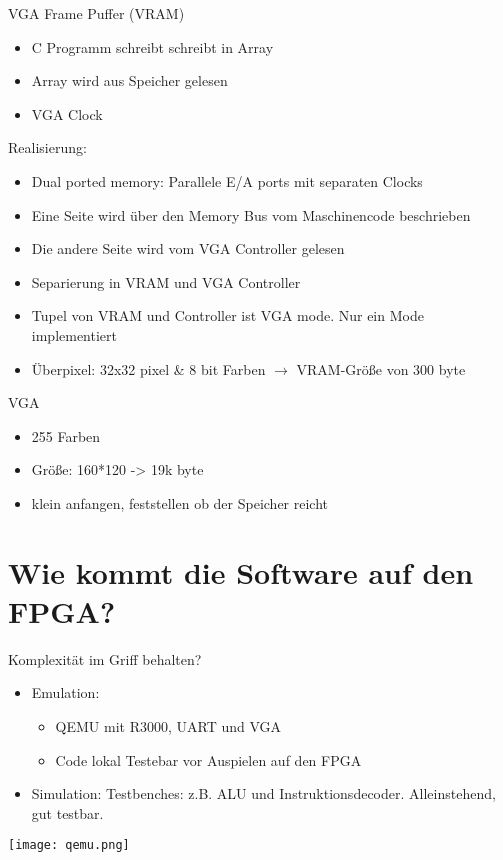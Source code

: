 \begin{frame}{VGA Frame Puffer (VRAM)}
	\begin{itemize}
		\item C Programm schreibt schreibt in Array
		\item Array wird aus Speicher gelesen
		\item VGA Clock
	\end{itemize}
	\pause
	Realisierung:
	\begin{itemize}
		\item Dual ported memory: Parallele E/A ports mit separaten Clocks
		\item Eine Seite wird über den Memory Bus vom Maschinencode beschrieben
		\item Die andere Seite wird vom VGA Controller gelesen
		\item Separierung in VRAM und VGA Controller
		\item Tupel von VRAM und Controller ist VGA mode. Nur ein Mode implementiert
		\item Überpixel: 32x32 pixel \& 8 bit Farben $\rightarrow$ VRAM-Größe von 300 byte
	\end{itemize}

\end{frame}

\begin{frame}{VGA}
	\begin{itemize}		
		\item 255 Farben
		\item Größe: 160*120 -> 19k byte
		\item klein anfangen, feststellen ob der Speicher reicht
	\end{itemize}
\end{frame}


\section{Wie kommt die Software auf den FPGA?}

\begin{frame}{Komplexität im Griff behalten?}

\begin{itemize}
\item Emulation:
\begin{itemize}
    \item QEMU mit R3000, UART und VGA
    \item Code lokal Testebar vor Auspielen auf den FPGA
\end{itemize}
    \item Simulation: Testbenches: z.B. ALU und Instruktionsdecoder. Alleinstehend, gut testbar.
\end{itemize}
\begin{center}
\texttt{[image: qemu.png]}
\end{center}

\end{frame}



